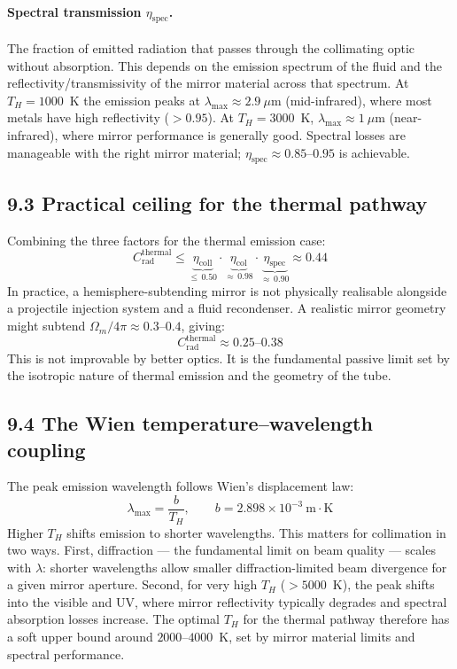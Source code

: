 \documentclass[12pt]{article}
\begin{document}
\paragraph{Spectral transmission $\eta_{\mathrm{spec}}$.}
The fraction of emitted radiation that passes through the collimating optic
without absorption. This depends on the emission spectrum of the fluid and
the reflectivity/transmissivity of the mirror material across that spectrum.
At $T_H = 1000$~K the emission peaks at $\lambda_{\max} \approx 2.9~\mu$m
(mid-infrared), where most metals have high reflectivity ($> 0.95$).
At $T_H = 3000$~K, $\lambda_{\max} \approx 1~\mu$m (near-infrared), where
mirror performance is generally good. Spectral losses are manageable with
the right mirror material; $\eta_{\mathrm{spec}} \approx 0.85$--$0.95$ is
achievable.

\subsection*{9.3 Practical ceiling for the thermal pathway}

Combining the three factors for the thermal emission case:
\[
  C_{\mathrm{rad}}^{\mathrm{thermal}} \leq
  \underbrace{\eta_{\mathrm{coll}}}_{\leq\,0.50}
  \cdot
  \underbrace{\eta_{\mathrm{col}}}_{\approx\,0.98}
  \cdot
  \underbrace{\eta_{\mathrm{spec}}}_{\approx\,0.90}
  \approx 0.44
\]
In practice, a hemisphere-subtending mirror is not physically realisable
alongside a projectile injection system and a fluid recondenser. A realistic
mirror geometry might subtend $\Omega_m / 4\pi \approx 0.3$--$0.4$, giving:
\[
  C_{\mathrm{rad}}^{\mathrm{thermal}} \approx 0.25\text{--}0.38
\]
This is not improvable by better optics. It is the fundamental passive limit
set by the isotropic nature of thermal emission and the geometry of the tube.

\subsection*{9.4 The Wien temperature–wavelength coupling}

The peak emission wavelength follows Wien's displacement law:
\[
  \lambda_{\max} = \frac{b}{T_H}, \qquad b = 2.898 \times 10^{-3}\ \mathrm{m\cdot K}
\]
Higher $T_H$ shifts emission to shorter wavelengths. This matters for collimation
in two ways. First, diffraction — the fundamental limit on beam quality —
scales with $\lambda$: shorter wavelengths allow smaller diffraction-limited
beam divergence for a given mirror aperture. Second, for very high $T_H$
($> 5000$~K), the peak shifts into the visible and UV, where mirror reflectivity
typically degrades and spectral absorption losses increase. The optimal $T_H$
for the thermal pathway therefore has a soft upper bound around $2000$--$4000$~K,
set by mirror material limits and spectral performance.
\end{document}
